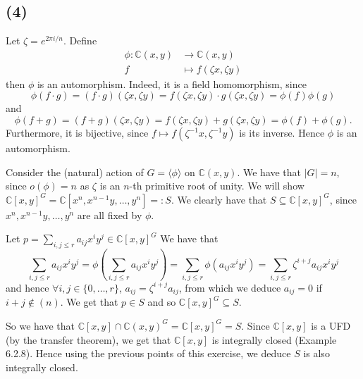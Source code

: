 \documentclass{article}
\newcommand{\C}{\mathbb{C}}
\begin{document}
\subsection*{(4)}

Let $\zeta = e^{2\pi i/n}$. Define
\begin{align*}
	\phi: \C(x, y) &\to \C(x, y)\\
	f &\mapsto f(\zeta x, \zeta y)
\end{align*}
then $\phi$ is an automorphism. Indeed, it is a field homomorphism, since
\begin{equation*}
	\phi(f \cdot g) = (f \cdot g) (\zeta x, \zeta y)
= f(\zeta x, \zeta y) \cdot g (\zeta x, \zeta y)
= \phi(f)\phi(g)
\end{equation*}
and 
\begin{equation*}
	\phi(f + g) = (f + g) (\zeta x, \zeta y)
= f(\zeta x, \zeta y) + g (\zeta x, \zeta y)
= \phi(f) + \phi(g).
\end{equation*}
Furthermore, it is bijective, since $f \mapsto f(\zeta^{-1}x, \zeta^{-1}y)$ is 
its inverse. Hence $\phi$ is an automorphism.

Consider the (natural) action of $G = \langle \phi \rangle$ on $\C(x, y)$.
We have that $|G| = n$, since $o(\phi) = n$ as $\zeta$ is an $n$-th primitive
root of unity.
We will show $\C[x, y]^G = \C[x^n, x^{n-1}y, \dots, y^n] =: S$.
We clearly have that $S \subseteq \C[x, y]^G$, since
$x^n, x^{n-1}y, \dots, y^n$ are all fixed by $\phi$.

Let $p = \sum_{i,j\leq r} a_{ij} x^i y^j \in \C[x, y]^G$
We have that
\begin{equation*}
\sum_{i,j\leq r} a_{ij} x^i y^j = 
\phi\left(\sum_{i,j\leq r} a_{ij} x^i y^j\right)
= \sum_{i,j\leq r} \phi(a_{ij} x^i y^j)
= \sum_{i,j\leq r} \zeta^{i+j}a_{ij} x^i y^j
\end{equation*}
and hence $\forall i,j \in \{0, \dots, r\}$, 
$a_{ij} = \zeta^{i+j}a_{ij}$, from which we deduce $a_{ij} = 0$ if $i+j \not\in 
(n)$. We get that $p \in S$ and so $\C[x, y]^G \subseteq S$.

So we have that $\C[x, y] \cap \C(x, y)^G = \C[x, y]^G = S$. Since $\C[x,y]$ is
a UFD (by the transfer theorem), we get that $\C[x,y ]$ is integrally closed
(Example 6.2.8). Hence using the previous points of this exercise,
we deduce $S$ is also integrally closed.
\end{document}
